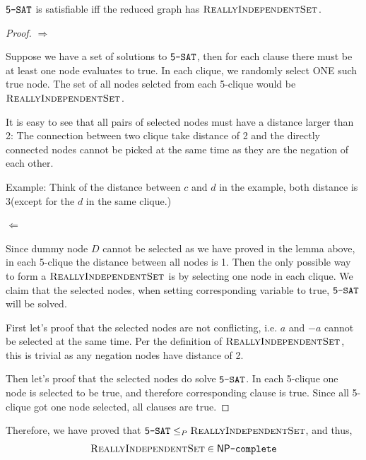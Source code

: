 \begin{theorem}
    $\mathsf{5}\texttt{-SAT}$ is satisfiable iff the reduced graph has $\textsc{ReallyIndependentSet}$.
\end{theorem}

\begin{proof}
    $\Rightarrow$
    
    Suppose we have a set of solutions to $\mathsf{5}\texttt{-SAT}$, then for each clause there must be at least one node evaluates to true.
    In each clique, we randomly select ONE such true node. The set of all nodes selcted from each 5-clique would be $\textsc{ReallyIndependentSet}$.

    It is easy to see that all pairs of selected nodes must have a distance larger than 2: The connection between two clique take distance of 2 and the directly connected nodes cannot be picked at the same time as they are the negation of each other.

    Example: Think of the distance between $c$ and $d$ in the example, both distance is 3(except for the $d$ in the same clique.)

    $\Leftarrow$

    Since dummy node $D$ cannot be selected as we have proved in the lemma above, in each 5-clique the distance between all nodes is 1. 
    Then the only possible way to form a $\textsc{ReallyIndependentSet}$ is by selecting one node in each clique.
    We claim that the selected nodes, when setting corresponding variable to true, $\mathsf{5}\texttt{-SAT}$ will be solved.

    First let's proof that the selected nodes are not conflicting, i.e. $a$ and $-a$ cannot be selected at the same time.
    Per the definition of $\textsc{ReallyIndependentSet}$, this is trivial as any negation nodes have distance of 2.

    Then let's proof that the selected nodes do solve $\mathsf{5}\texttt{-SAT}$.
    In each 5-clique one node is selected to be true, and therefore corresponding clause is true. 
    Since all 5-clique got one node selected, all clauses are true.
\end{proof}

Therefore, we have proved  that $\mathsf{5}\texttt{-SAT} \le_P \textsc{ReallyIndependentSet}$, and thus, $$\textsc{ReallyIndependentSet} \in \mathsf{NP}\texttt{-complete}$$


